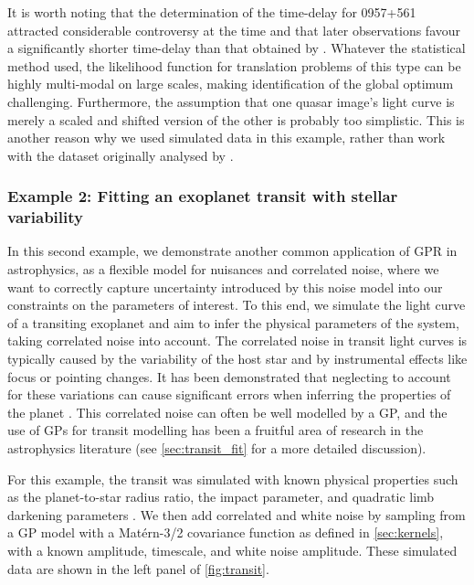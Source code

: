 \documentclass[letterpaper]{ar-1col}
\begin{document}
It is worth noting that the determination of the time-delay for 0957+561 attracted considerable controversy at the time \citep[see][and references therein]{1995ApJ...455L...5K} and that later observations \citep{1997ApJ...482...75K} favour a significantly shorter time-delay than that obtained by \citet{prh92a}. Whatever the statistical method used, 
the likelihood function for translation problems of this type can be highly multi-modal on large scales, making identification of the global optimum challenging. Furthermore, the assumption that one quasar image's light curve is merely a scaled and shifted version of the other is probably too simplistic. This is another reason why we used simulated data in this example, rather than work with the  dataset originally analysed by \citet{prh92a}.


\subsubsection{Example 2: Fitting an exoplanet transit with stellar variability}
\label{sec:transit}

In this second example, we demonstrate another common application of GPR in astrophysics, as a flexible model for nuisances and correlated noise, where we want to correctly capture uncertainty introduced by this noise model into our constraints on the parameters of interest.
To this end, we simulate the light curve of a transiting exoplanet and aim to infer the physical parameters of the system, taking correlated noise into account.
The correlated noise in transit light curves is typically caused by the variability of the host star and by instrumental effects like focus or pointing changes.
It has been demonstrated that neglecting to account for these variations can cause significant errors when inferring the properties of the planet \citep{2006MNRAS.373..231P,2007A&A...472L..13G}.
This correlated noise can often be well modelled by a GP, and the use of GPs for transit modelling has been a fruitful area of research in the astrophysics literature (see \autoref{sec:transit_fit} for a more detailed discussion).

For this example, the transit was simulated with known physical properties such as the planet-to-star radius ratio, the impact parameter, and quadratic limb darkening parameters \citep{2020AJ....159..123A}.
We then add correlated and white noise by sampling from a GP model with a Mat\'ern-3/2 covariance function as defined in \autoref{sec:kernels}, with a known amplitude, timescale, and white noise amplitude.
These simulated data are shown in the left panel of \autoref{fig:transit}.
\end{document}
